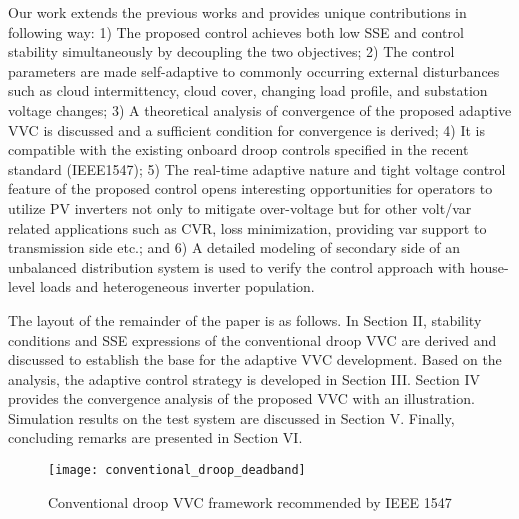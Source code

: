 \documentclass[journal]{IEEEtran}
\newcommand{\squeezeup}{\vspace{-2.5mm}}
\begin{document}
Our work extends the previous works and provides unique contributions in following way: 1) The proposed control achieves both low SSE and control stability simultaneously by decoupling the two objectives; 2) The control parameters are made self-adaptive to  commonly occurring external disturbances such as cloud intermittency, cloud cover, changing load profile, and substation voltage changes; 3) A theoretical analysis of convergence of the proposed adaptive VVC is discussed and a sufficient condition for convergence is derived; 4) It is compatible with the existing onboard droop controls specified in the recent standard (IEEE1547); 5) The real-time adaptive nature and tight voltage control feature of the proposed control opens interesting opportunities for operators to utilize PV inverters not only to mitigate over-voltage but for other volt/var related applications such as CVR, loss minimization, providing var support to transmission side etc.; and 6) A detailed modeling of secondary side of an unbalanced distribution system is used to verify the control approach with house-level loads and heterogeneous inverter population.

The layout of the remainder of the paper is as follows. In Section II, stability conditions and SSE expressions of the conventional droop VVC are derived and discussed to establish the base for the adaptive VVC development. Based on the analysis, the adaptive control strategy is developed in Section III. Section IV provides the convergence analysis of the proposed VVC with an illustration. Simulation results on the test system are discussed in Section V. Finally, concluding remarks are presented in Section VI.

\begin{figure}[t]
	\centering
	\texttt{[image: conventional\_droop\_deadband]}
    \squeezeup
    \caption {Conventional droop VVC framework recommended by IEEE 1547 }
    \vspace{-2mm}
    \label{fig:std_droop}
\end{figure}
\end{document}
